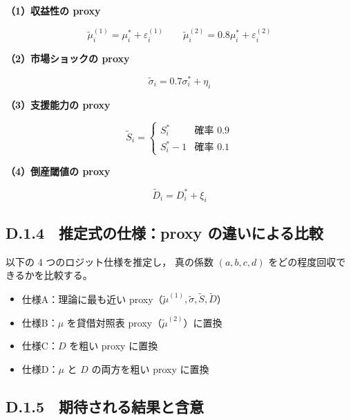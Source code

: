 \noindent\textbf{（1）収益性の proxy}



\[
\tilde{\mu}^{(1)}_i = \mu^{\ast}_i + \varepsilon^{(1)}_i
\qquad
\tilde{\mu}^{(2)}_i = 0.8 \mu^{\ast}_i + \varepsilon^{(2)}_i
\]



\noindent\textbf{（2）市場ショックの proxy}



\[
\tilde{\sigma}_i = 0.7 \sigma^{\ast}_i + \eta_i
\]



\noindent\textbf{（3）支援能力の proxy}



\[
\tilde{S}_i =
\begin{cases}
S^{\ast}_i & \text{確率 } 0.9 \\
S^{\ast}_i - 1 & \text{確率 } 0.1
\end{cases}
\]



\noindent\textbf{（4）倒産閾値の proxy}



\[
\tilde{D}_i = D^{\ast}_i + \xi_i
\]



\subsection*{D.1.4　推定式の仕様：proxy の違いによる比較}

以下の 4 つのロジット仕様を推定し，
真の係数 $(a,b,c,d)$ をどの程度回収できるかを比較する。

\begin{itemize}
    \item 仕様A：理論に最も近い proxy（$\tilde{\mu}^{(1)}, \tilde{\sigma}, \tilde{S}, \tilde{D}$）
    \item 仕様B：$\mu$ を貸借対照表 proxy（$\tilde{\mu}^{(2)}$）に置換
    \item 仕様C：$D$ を粗い proxy に置換
    \item 仕様D：$\mu$ と $D$ の両方を粗い proxy に置換
\end{itemize}

\subsection*{D.1.5　期待される結果と含意}

